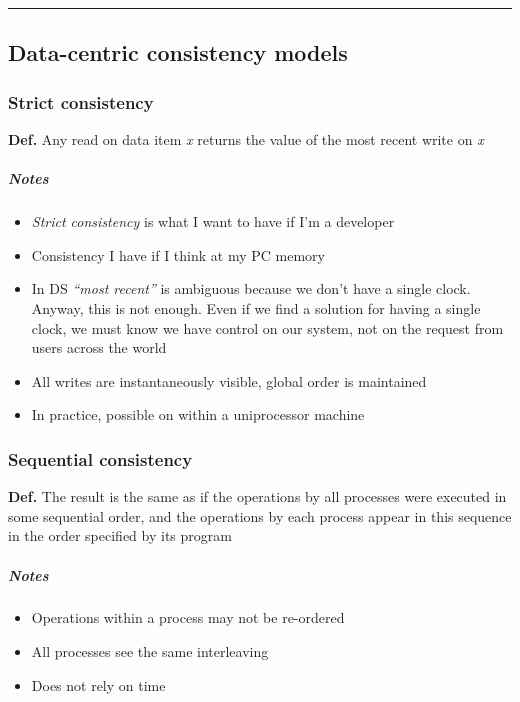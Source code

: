 \begin{center}\rule{3in}{0.4pt}\end{center}

\subsection{Data-centric consistency models}

\subsubsection{Strict consistency}

\textbf{Def.} Any read on data item \emph{x} returns the value of the
most recent write on \emph{x}

\subparagraph{Notes}

\begin{itemize}
    \item
      \emph{Strict consistency} is what I want to have if I'm a developer
    \item
      Consistency I have if I think at my PC memory
    \item
      In DS \emph{``most recent''} is ambiguous because we don't have a
      single clock. Anyway, this is not enough. Even if we find a solution for having a single
      clock, we must know we have control on our system, not on the request
      from users across the world
    \item
      All writes are instantaneously visible, global order is maintained
    \item
      In practice, possible on within a uniprocessor machine
\end{itemize}

\subsubsection{Sequential consistency}

\textbf{Def. } The result is the same as if the operations by all
processes were executed in some sequential order, and the operations by
each process appear in this sequence in the order specified by its
program

\subparagraph{Notes}

\begin{itemize}
    \item
      Operations within a process may not be re-ordered
    \item
      All processes see the same interleaving
    \item
      Does not rely on time
\end{itemize}

